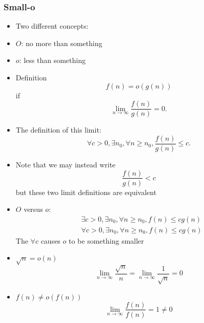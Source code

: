 




\begin{frame}[allowframebreaks] \frametitle{Small-o}
  \begin{itemize}
  \item Two different concepts:

  \item [] $O$: no more than something

  \item [] $o$: less than something
    
\item Definition 
  \begin{equation*}
  f(n)=o(g(n))
\end{equation*}
  if
  \begin{equation*}
    \lim_{n\rightarrow \infty} \frac{f(n)}{g(n)} = 0.
  \end{equation*}
\item The definition of this limit:
\begin{equation*}
  \forall c > 0, \exists n_0, \forall n \geq n_0,
\frac{f(n)}{g(n)} \leq c.
\end{equation*}
\item Note that we may instead write
  \begin{equation*}
\frac{f(n)}{g(n)} < c
\end{equation*}
but these two limit definitions are equivalent
\item $O$ versus $o$:
\begin{equation*}
  \begin{split}
&  \exists c > 0, \exists n_0, \forall n \geq n_0,
f(n) \leq c g(n)\\    
&  \forall c > 0, \exists n_0, \forall n \geq n_0,
f(n) \leq c g(n)
\end{split}
\end{equation*}
The $\forall c$ causes $o$ to be something smaller
\item $\sqrt{n}= o(n)$
  \begin{equation*}
    \lim_{n \rightarrow \infty} \frac{\sqrt{n}}{n}
=
   \lim_{n \rightarrow \infty} \frac{1}{\sqrt{n}}=0
  \end{equation*}
\item $f(n) 
\neq o(f(n))$
\begin{equation*}
    \lim_{n \rightarrow \infty} \frac{f(n)}{f(n)} = 1 \neq 0
\end{equation*}

\end{itemize}\end{frame}

